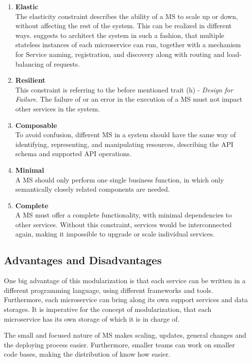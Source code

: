 \begin{enumerate}[(1.)]
	\item \textbf{Elastic}\\
	The elasticity constraint describes the ability of a MS to scale up or down, without affecting the rest of the system. This can be realized in different ways. \cite{Bugwadia15} suggests to architect the system in such a fashion, that multiple stateless instances of each microservice can run, together with a mechanism for Service naming, registration, and discovery along with routing and load-balancing of requests.
	\item \textbf{Resilient}\\
	This constraint is referring to the before mentioned trait (h) - \emph{Design for Failure}. The failure of or an error in the execution of a MS must not impact other services in the system.
	\item \textbf{Composable}\\
	To avoid confusion, different MS in a system should have the same way of identifying, representing, and manipulating resources, describing the API schema and supported API operations.
	\item \textbf{Minimal}\\
	A MS should only perform one single business function, in which only semantically closely related components are needed.
	\item \textbf{Complete}\\
	A MS must offer a complete functionality, with minimal dependencies to other services. Without this constraint, services would be interconnected again, making it impossible to upgrade or scale individual services.
\end{enumerate}


\subsection{Advantages and Disadvantages}
One big advantage of this modularization is that each service can be written in a different programming language, using different frameworks and tools. Furthermore, each microservice can bring along its own support services and data storages. It is imperative for the concept of modularization, that each microservice has its own storage of which it is in charge of\cite{Wolff16}.

The small and focused nature of MS makes scaling, updates, general changes and the deploying process easier. Furthermore, smaller teams can work on smaller code bases, making the distribution of know how easier\cite{Riggins15}.


